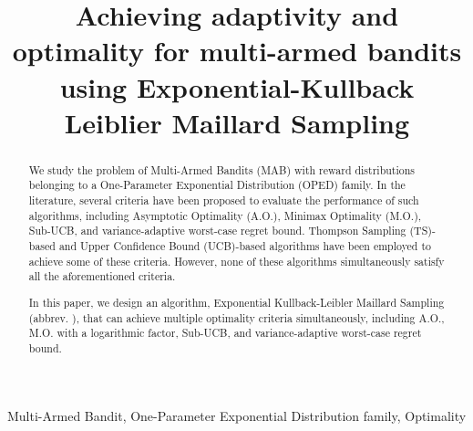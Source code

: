 \documentclass{colt2025}
\title[Exp-KL-MS]{Achieving adaptivity and optimality for multi-armed bandits using Exponential-Kullback Leiblier Maillard Sampling}
\begin{document}

\maketitle

\begin{abstract}%

We study the problem of Multi-Armed Bandits (MAB) with reward distributions belonging to a One-Parameter Exponential Distribution (OPED) family. In the literature, several criteria have been proposed to evaluate the performance of such algorithms, including Asymptotic Optimality (A.O.), Minimax Optimality (M.O.), Sub-UCB, and variance-adaptive worst-case regret bound. Thompson Sampling (TS)-based and Upper Confidence Bound (UCB)-based algorithms have been employed to achieve some of these criteria. However, none of these algorithms simultaneously satisfy all the aforementioned criteria.

In this paper, we design an algorithm, Exponential Kullback-Leibler Maillard Sampling (abbrev. \expklms), that can achieve multiple optimality criteria simultaneously, including A.O., M.O. with a logarithmic factor, Sub-UCB, and variance-adaptive worst-case regret bound.
\end{abstract}

\begin{keywords}%
  Multi-Armed Bandit, One-Parameter Exponential Distribution family, Optimality
\end{keywords}



















\appendix

\end{document}
